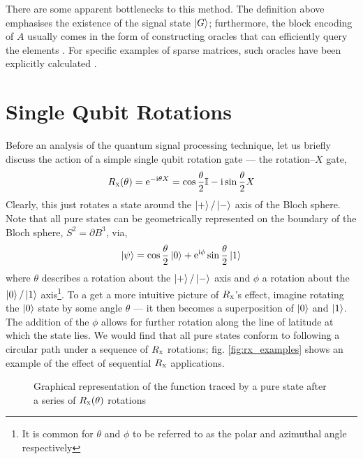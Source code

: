 \documentclass{article}
\begin{document}
There are some apparent bottlenecks to this method. The definition above emphasises the existence of the signal state $\ket{G}$; furthermore, the block encoding of $A$ usually comes in the form of constructing oracles that can efficiently query the elements \cite{BCK15,CKS17}. For specific examples of sparse matrices, such oracles have been explicitly calculated \cite{CLBY23}. 

\clearpage
\section{Single Qubit Rotations}
Before an analysis of the quantum signal processing technique, let us briefly discuss the action of a simple single qubit rotation gate --- the rotation--$X$ gate,
\begin{equation}\label{eq:rotX}
    R_{\textsc{x}}(\theta) = \mathrm{e}^{-\mathrm{i} \theta X} = \cos\frac{\theta}{2}\mathbb{I} - \mathrm{i}\sin\frac{\theta}{2}X
\end{equation}
Clearly, this just rotates a state around the $\ket{+}/\ket{-}$ axis of the Bloch sphere. Note that all pure states can be geometrically represented on the boundary of the Bloch sphere, $S^2 = \partial B^3$, via,
\begin{equation}
    \ket{\psi} = \cos\frac{\theta}{2}\ket{0} + \mathrm{e}^{\mathrm{i} \phi}\sin\frac{\theta}{2}\ket{1}
\end{equation}
where $\theta$ describes a rotation about the $\ket{+}/\ket{-}$ axis and $\phi$ a rotation about the $\ket{0}/\ket{1}$ axis\footnote{It is common for $\theta$ and $\phi$ to be referred to as the polar and azimuthal angle respectively}. To a get a more intuitive picture of $R_{\textsc{x}}$'s effect, imagine rotating the $\ket{0}$ state by some angle $\theta$ --- it then becomes a superposition of $\ket{0}$ and $\ket{1}$. The addition of the $\phi$ allows for further rotation along the line of latitude at which the state lies. We would find that all pure states conform to following a circular path under a sequence of $R_{\textsc{x}}$ rotations; fig. \ref{fig:rx_examples} shows an example of the effect of sequential $R_{\textsc{x}}$ applications. 

\begin{figure}[h!]
    \centering
    \caption{Graphical representation of the function traced by a pure state after a series of $R_{\textsc{x}}(\theta)$ rotations}
    \label{fig:cos}
\end{figure}
\end{document}
